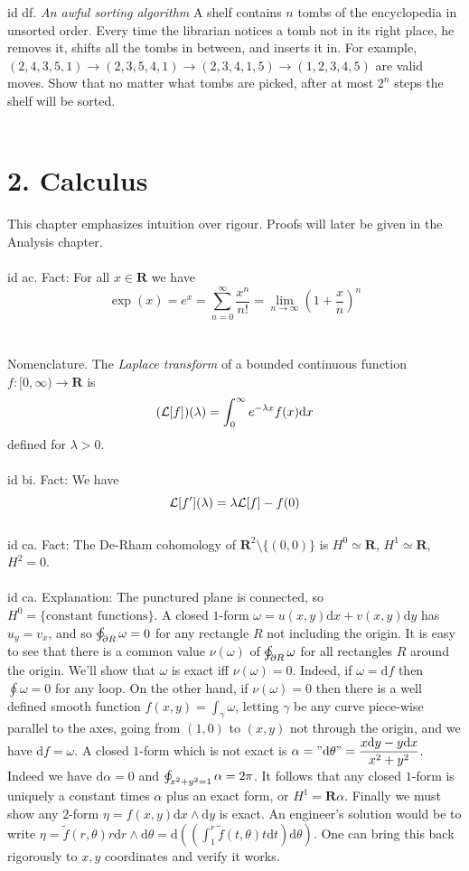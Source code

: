 \documentclass[oneside]{book}
\newcommand{\cint}{\varointctrclockwise}
\newcommand{\R}{\mathbf{R}}
\newcommand{\set}[1]{\{ #1\}}
\newcommand{\fit}[1]{\left( #1\right)}
\renewcommand{\d}{\mathrm{d}}
\newcommand\chap[1]{%
  \chapter*{#1}%
  \addcontentsline{toc}{chapter}{#1}}
\begin{document}
id df. {\it An awful sorting algorithm} A shelf contains $n$ tombs of the encyclopedia in unsorted order. Every time the librarian notices a tomb not in its right place, he removes it, shifts all the tombs in between, and inserts it in. For example, $(2,4,3,5,1)\to(2,3,5,4,1)\to(2,3,4,1,5)\to(1,2,3,4,5)$ are valid moves. Show that no matter what tombs are picked, after at most $2^n$ steps the shelf will be sorted.\\\\



\newpage
\chap{2. Calculus}
This chapter emphasizes intuition over rigour. Proofs will later be given in the Analysis chapter.   \\\\


id ac. Fact: For all $x\in\R$ we have $$\exp(x)=e^x=\sum_{n=0}^\infty \frac{x^n}{n!} = \lim_{n\to\infty}\fit{1+\frac{x}{n}}^n$$     \\\\


Nomenclature. The {\it Laplace transform} of a bounded continuous function $f:[0,\infty)\to\R$ is $$(\LL[f])(\lambda)=\int_0^\infty e^{-\lambda x}f(x)\d x$$
defined for $\lambda > 0$. \\\\


id bi. Fact: We have $$\mathcal{L}[f'](\lambda)=\lambda\mathcal{L}[f] - f(0)$$ \\


id ca. Fact: The De-Rham cohomology of $\R^2\setminus\set{(0,0)}$ is $H^0\simeq \R$, $H^1\simeq \R$, $H^2=0$. \\\\


id ca. Explanation: The punctured plane is connected, so $H^0=\set{\text{constant functions}}$. A closed $1$-form $\omega = u(x,y)\d x+v(x,y)\d y$ has $u_y=v_x$, and so $ \cint_{\partial R}\omega = 0$ for any rectangle $R$ not including the origin. It is easy to see that there is a common value $\nu(\omega)$ of $\cint_{\partial R}\omega$ for all rectangles $R$ around the origin. We'll show that $\omega$ is exact iff $\nu(\omega)= 0$. Indeed, if $\omega = \d f$ then $\oint \omega=0$ for any loop. On the other hand, if $\nu(\omega)=0$ then there is a well defined smooth function $f(x,y)=\int_{\gamma} \omega$, letting $\gamma$ be any curve piece-wise parallel to the axes, going from $(1,0)$ to $(x,y)$ not through the origin, and we have $\d f=\omega$. A closed $1$-form which is not exact is $\alpha="\d \theta"=\dfrac{x\d y-y\d x}{x^2+y^2}$. Indeed we have $\d \alpha = 0$ and $\cint_{x^2+y^2=1}\alpha = 2\pi$. It follows that any closed $1$-form is uniquely a constant times $\alpha$ plus an exact form, or $H^1=\R\alpha$. Finally we must show any $2$-form $\eta=f(x,y)\d x\wedge \d y$ is exact. An engineer's solution would be to write
$\eta = \tilde{f}(r,\theta)r\d r\wedge \d\theta = \d\fit{\fit{\int_1^r \tilde{f}(t,\theta)t\d t}\d \theta}$. One can bring this back rigorously to $x,y$ coordinates and verify it works.  \\\\
\end{document}
